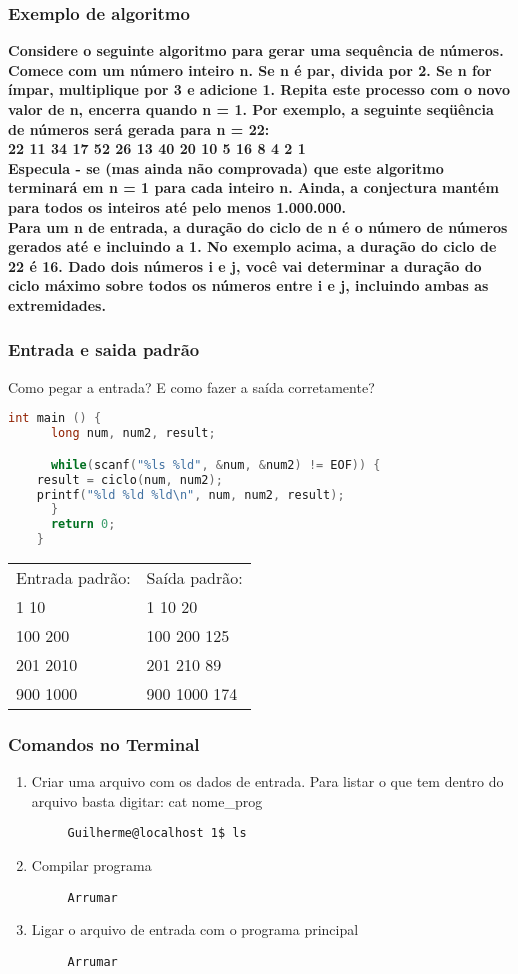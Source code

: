 \begin{frame}
  \frametitle{Exemplo de algoritmo}
  \textbf{\small Considere o seguinte algoritmo para gerar uma sequência de números. Comece com um número inteiro n. Se n é par, divida por 2. Se n for ímpar, multiplique por 3 e adicione 1. Repita este processo com o novo valor de n, encerra quando n = 1. Por exemplo, a seguinte seqüência de números será gerada para n = 22:\\22 11 34 17 52 26 13 40 20 10 5 16 8 4 2 1\\}
  \textbf{\small Especula - se (mas ainda não comprovada) que este algoritmo terminará em n = 1 para cada inteiro n. Ainda, a conjectura mantém para todos os inteiros até pelo menos 1.000.000.\\Para um n de entrada, a duração do ciclo de n é o número de números gerados até e incluindo a 1. No exemplo acima, a duração do ciclo de 22 é 16. Dado dois números i e j, você vai determinar a duração do ciclo máximo sobre todos os números entre i e j, incluindo ambas as extremidades.}
\end{frame}

\begin{frame}[fragile]
  \frametitle{Entrada e saida padrão}
  Como pegar a entrada? E como fazer a saída corretamente?
  \begin{lstlisting}[language=c]
    int main () {
      long num, num2, result;

      while(scanf("%ls %ld", &num, &num2) != EOF)) {
	result = ciclo(num, num2);
	printf("%ld %ld %ld\n", num, num2, result); 
      }
      return 0;
    }
  \end{lstlisting}
  \begin{tabular}{ll}\\
    Entrada padrão: &Saída padrão:\\
    1 10 &1 10 20\\
    100 200 &100 200 125\\
    201 2010 &201 210 89\\
    900 1000 &900 1000 174\\	
  \end{tabular}
\end{frame}

\begin{frame}[fragile]
  \frametitle{Comandos no Terminal}
  \begin{enumerate}
    \item Criar uma arquivo com os dados de entrada. Para listar o que tem dentro do arquivo basta digitar: cat nome\_prog
    \begin{lstlisting}
     Guilherme@localhost 1$ ls
    \end{lstlisting}
    \item Compilar programa
    \begin{lstlisting}
     Arrumar
    \end{lstlisting}
    \item Ligar o arquivo de entrada com o programa principal
    \begin{lstlisting}
     Arrumar
    \end{lstlisting}
  \end{enumerate}
\end{frame}